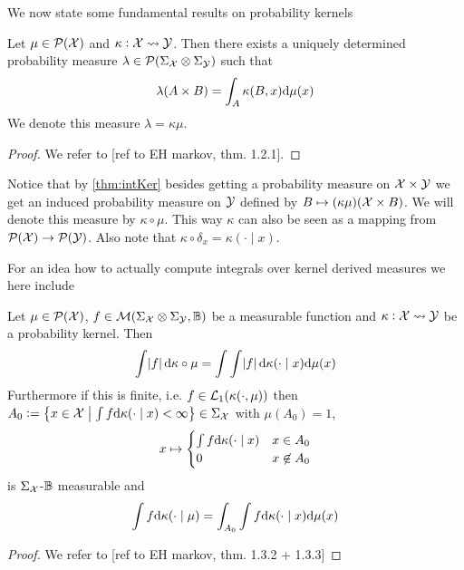 We now state some fundamental results on probability kernels
\begin{thm}
  Let $\mu \in \mathcal{P}(\mathcal{X})$ and $\kappa : \mathcal{X} \leadsto \mathcal{Y}$.
  Then there exists a uniquely determined probability measure
  $\lambda \in \mathcal{P}(\Sigma_\mathcal{X} \otimes \Sigma_\mathcal{Y})$
  such that
  \[ \lambda(A \times B) = \int_A \kappa(B, x) \mathrm{d} \mu(x) \]
  \label{thm:intKer}
  We denote this measure $\lambda = \kappa \mu$.
\end{thm}
\begin{proof}
  We refer to [ref to EH markov, thm. 1.2.1].
\end{proof}

Notice that by \cref{thm:intKer}
besides getting a probability measure on $\mathcal{X} \times \mathcal{Y}$
we get an induced probability measure
on $\mathcal{Y}$ defined by $B \mapsto (\kappa \mu)(\mathcal{X} \times B)$.
We will denote this measure by $\kappa \circ \mu$.
This way $\kappa$ can also be seen as a mapping from
$\mathcal{P}(\mathcal{X}) \to \mathcal{P}(\mathcal{Y})$.
Also note that $\kappa \circ \delta_x = \kappa(\cdot \mid x)$.

For an idea how to actually compute integrals over kernel derived measures
we here include
\begin{thm}
  Let $\mu \in \mathcal{P}(\mathcal{X})$,
  $f \in \mathcal{M}(\Sigma_\mathcal{X} \otimes \Sigma_\mathcal{Y}, \mathbb{B})$
  be a measurable function and
  $\kappa : \mathcal{X} \leadsto \mathcal{Y}$ be a probability kernel.
  Then
  \[ \int \abs{f} \mathrm{d} \kappa \circ \mu
  = \int \int \abs{f} \mathrm{d} \kappa(\cdot \mid x) \mathrm{d} \mu(x) \]
  Furthermore if this is finite, i.e. $f \in \mathcal{L}_1(\kappa(\cdot, \mu))$
  then $A_0 \vcentcolon= \left\{ x \in \mathcal{X} \;\middle\vert\;
    \int f \mathrm{d} \kappa(\cdot \mid x) < \infty \right\}
  \in \Sigma_\mathcal{X}$
  with $\mu(A_0) = 1$, 
  \[ x \mapsto \begin{cases}
      \int f \mathrm{d} \kappa(\cdot \mid x) & x \in A_0
      \\ 0 & x \not\in A_0
  \end{cases} \]
  is $\Sigma_\mathcal{X}$-$\mathbb{B}$ measurable and
  \[ \int f \mathrm{d} \kappa(\cdot \mid \mu)
  = \int_{A_0} \int f \mathrm{d} \kappa(\cdot \mid x) \mathrm{d} \mu(x) \]  
  \label{thm:extTonFub}
\end{thm}
\begin{proof}
  We refer to [ref to EH markov, thm. 1.3.2 + 1.3.3]
\end{proof}

